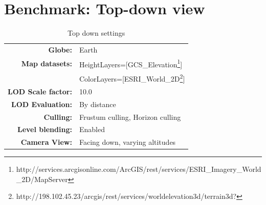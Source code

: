 \section{Benchmark: Top-down view}
\FloatBarrier
\begin{table}[h]
  \centering
  \caption[]{Top down settings}
    \label{table:settingstopdown}
  \begin{tabular}{| r l |}
    \hline
      \textbf{Globe:}             & Earth \\
      \textbf{Map datasets:}      & HeightLayers=[GCS\_Elevation\footnote{http://services.arcgisonline.com/ArcGIS/rest/services/ESRI\_Imagery\_World\_2D/MapServer}] \\
                                  & ColorLayers=[ESRI\_World\_2D\footnote{http://198.102.45.23/arcgis/rest/services/worldelevation3d/terrain3d?}] \\
      \textbf{LOD Scale factor:}  & 10.0 \\
      \textbf{LOD Evaluation:}    & By distance \\
      \textbf{Culling:}           & Frustum culling, Horizon culling \\
      \textbf{Level blending:}    & Enabled \\
      \textbf{Camera View:}       & Facing down, varying altitudes\\
    \hline
  \end{tabular}
\end{table}
